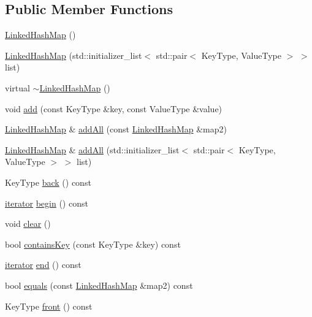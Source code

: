 \subsection*{Public Member Functions}
\begin{DoxyCompactItemize}
\item 
\mbox{\hyperlink{classLinkedHashMap_ab932f67a053ddecd3337c7102d4c6809}{Linked\+Hash\+Map}} ()
\item 
\mbox{\hyperlink{classLinkedHashMap_a769b373146aef8dacb8767f43066d4cd}{Linked\+Hash\+Map}} (std\+::initializer\+\_\+list$<$ std\+::pair$<$ Key\+Type, Value\+Type $>$ $>$ list)
\item 
virtual \mbox{\hyperlink{classLinkedHashMap_ac43ee366ad6cddcd132ecc8b0b11318b}{$\sim$\+Linked\+Hash\+Map}} ()
\item 
void \mbox{\hyperlink{classLinkedHashMap_a9129d6095063e7e14d85c627d35086a5}{add}} (const Key\+Type \&key, const Value\+Type \&value)
\item 
\mbox{\hyperlink{classLinkedHashMap}{Linked\+Hash\+Map}} \& \mbox{\hyperlink{classLinkedHashMap_a9e6cd6e8273810ac99a612cdf14f084c}{add\+All}} (const \mbox{\hyperlink{classLinkedHashMap}{Linked\+Hash\+Map}} \&map2)
\item 
\mbox{\hyperlink{classLinkedHashMap}{Linked\+Hash\+Map}} \& \mbox{\hyperlink{classLinkedHashMap_a978384e74cf368abfc3971c76c08a8df}{add\+All}} (std\+::initializer\+\_\+list$<$ std\+::pair$<$ Key\+Type, Value\+Type $>$ $>$ list)
\item 
Key\+Type \mbox{\hyperlink{classLinkedHashMap_adfa4b8f8e4f5ecc11fb76a3efba70d70}{back}} () const
\item 
\mbox{\hyperlink{classLinkedHashMap_1_1iterator}{iterator}} \mbox{\hyperlink{classLinkedHashMap_a0c62c15c8ed609e7e5e9518cf5f5c712}{begin}} () const
\item 
void \mbox{\hyperlink{classLinkedHashMap_ac8bb3912a3ce86b15842e79d0b421204}{clear}} ()
\item 
bool \mbox{\hyperlink{classLinkedHashMap_a37473445b6725c5f0fc59a32ea2e645e}{contains\+Key}} (const Key\+Type \&key) const
\item 
\mbox{\hyperlink{classLinkedHashMap_1_1iterator}{iterator}} \mbox{\hyperlink{classLinkedHashMap_a68b688a51bd0cf6fb5bc2cba292209a8}{end}} () const
\item 
bool \mbox{\hyperlink{classLinkedHashMap_ad02a403a51be973f5e44812f9b7d897a}{equals}} (const \mbox{\hyperlink{classLinkedHashMap}{Linked\+Hash\+Map}} \&map2) const
\item 
Key\+Type \mbox{\hyperlink{classLinkedHashMap_a6e76878901fa73e176909ac015834f1a}{front}} () const

\end{DoxyCompactItemize}
